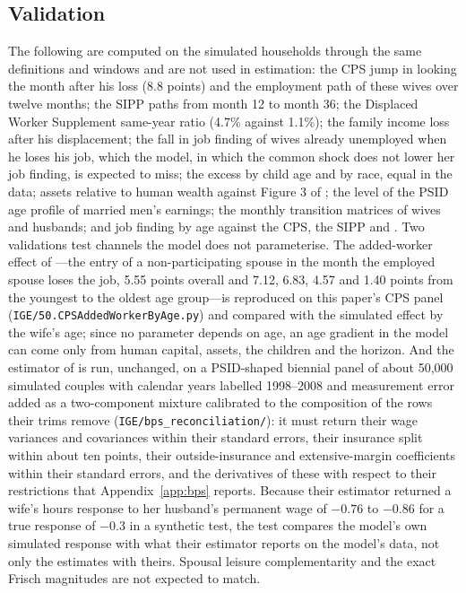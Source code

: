 \subsection{Validation}\label{sec:validation}

The following are computed on the simulated households through the same definitions and windows and are not used in
estimation: the CPS jump in looking the month after his loss (8.8 points) and the employment path of these wives
over twelve months; the SIPP paths from month 12 to month 36; the Displaced Worker Supplement same-year ratio (4.7\%
against 1.1\%); the family income loss after his displacement; the fall in job finding of wives already unemployed
when he loses his job, which the model, in which the common shock does not lower her job finding, is expected to miss;
the excess by child age and by race, equal in the data; assets relative to human wealth against Figure 3 of
\citet{blundell2016consumption}; the level of the PSID age profile of married men's earnings; the monthly transition
matrices of wives and husbands; and job finding by age against the CPS, the SIPP and \citet{bacher2025joint}. Two
validations test channels the model does not parameterise. The added-worker effect of \citet{bacher2025joint}---the
entry of a non-participating spouse in the month the employed spouse loses the job, 5.55 points overall and 7.12,
6.83, 4.57 and 1.40 points from the youngest to the oldest age group---is reproduced on this paper's CPS panel
(\texttt{IGE/50.CPSAddedWorkerByAge.py}) and compared with the simulated effect by the wife's age; since no parameter
depends on age, an age gradient in the model can come only from human capital, assets, the children and the horizon.
And the estimator of \citet{blundell2016consumption} is run, unchanged, on a PSID-shaped biennial panel of about 50,000
simulated couples with calendar years labelled 1998--2008 and measurement error added as a two-component mixture
calibrated to the composition of the rows their trims remove (\texttt{IGE/bps\_reconciliation/}): it must return their
wage variances and covariances within their standard errors, their insurance split within about ten points, their
outside-insurance and extensive-margin coefficients within their standard errors, and the derivatives of these with
respect to their restrictions that Appendix~\ref{app:bps} reports. Because their estimator returned a wife's hours
response to her husband's permanent wage of $-0.76$ to $-0.86$ for a true response of $-0.3$ in a synthetic test, the
test compares the model's own simulated response with what their estimator reports on the model's data, not only the
estimates with theirs. Spousal leisure complementarity and the exact Frisch magnitudes are not expected to match.

